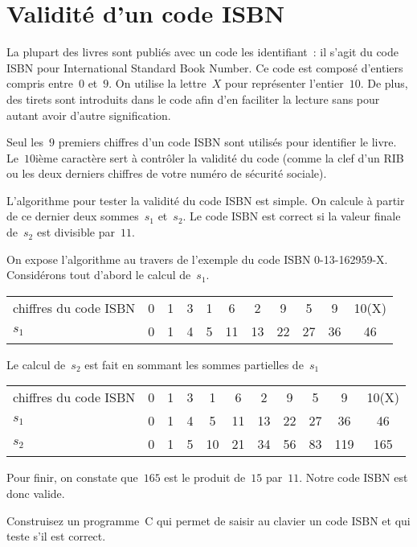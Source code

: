 \section{Validit\'e d'un code ISBN}
\label{sec:ISBN}
  La plupart des livres sont publi\'es avec  un code les identifiant~:
  il s'agit  du code ISBN  pour International Standard Book Number. Ce
  code est compos\'e d'entiers compris entre~$0$ et~$9$. On utilise la
  lettre~$X$  pour  repr\'esenter l'entier~$10$.   De plus, des tirets
  sont introduits dans le code afin d'en faciliter la lecture sans pour
  autant avoir d'autre signification.
  \par
  Seul les~$9$ premiers  chiffres d'un code  ISBN sont utilis\'es pour
  identifier le livre.  Le~$10$i\`eme caract\`ere sert \`a contr\^oler
  la validit\'e du code (comme  la clef d'un RIB  ou les deux derniers
  chiffres de votre num\'ero de s\'ecurit\'e sociale).
  \par
  L'algorithme pour tester la validit\'e du code ISBN  est simple.  On
  calcule \`a partir de ce  dernier deux sommes~$s_{1}$ et~$s_{2}$. Le
  code ISBN  est correct si la valeur  finale de~$s_{2}$ est divisible
  par~$11$.
  \par
  On  expose l'algorithme    au  travers de   l'exemple  du code  ISBN
  0-13-162959-X.  Consid\'erons tout d'abord le calcul de~$s_{1}$.
  \par
  \begin{tabular}{lcccccccccc}
    chiffres du code ISBN& 0 & 1 & 3 & 1 &  6 &  2 &  9 &  5 &  9 &  10(X)\\
    $s_{1}$ & 0 &   1 &  4 &  5 & 11 & 13 & 22 & 27 & 36 &  46
  \end{tabular}
  \par
  Le calcul de~$s_{2}$ est fait en sommant les sommes partielles de~$s_{1}$
  \par
  \begin{tabular}{lcccccccccc}
    chiffres du code ISBN & 0 & 1 & 3 & 1 & 6 &  2 &  9 &  5 &  9 &  10(X)\\
    $s_{1}$ & 0 &   1 &  4 &  5 & 11 & 13 & 22 & 27 & 36 &  46 \\
    $s_{2}$ & 0 &  1 &  5 & 10 & 21 & 34&  56&  83&  119 & 165 
  \end{tabular}
  \par
  Pour finir,  on constate que~$165$ est le  produit de~$15$ par~$11$. 
  Notre code ISBN est donc valide.
  \begin{exercice}[Question]
  Construisez  un programme~C qui permet  de saisir au clavier un code
  ISBN et qui teste s'il est correct.
  \ifcorrection
  \begin{correction}
        
  \end{correction}
  \fi
\end{exercice}
